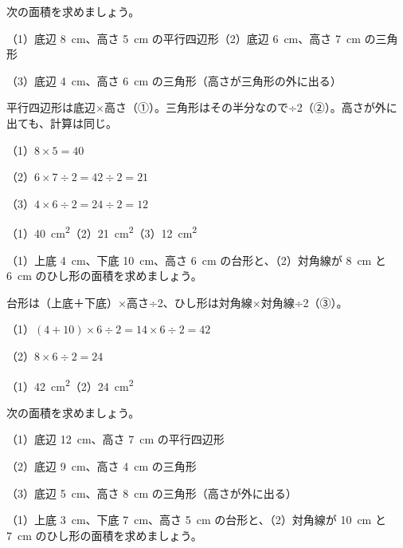 \begin{reidai}[平行四辺形と三角形の面積]
次の面積を求めましょう。\par
（1）底辺 \qty{8}{cm}、高さ \qty{5}{cm} の平行四辺形\quad（2）底辺 \qty{6}{cm}、高さ \qty{7}{cm} の三角形\par
（3）底辺 \qty{4}{cm}、高さ \qty{6}{cm} の三角形（高さが三角形の外に出る）\par
\kangaekata 平行四辺形は底辺×高さ（①）。三角形はその半分なので÷2（②）。高さが外に出ても、計算は同じ。\par
\shiki（1）$8\times5=40$\par
\hspace*{2.6\zw}（2）$6\times7\div2=42\div2=21$\par
\hspace*{2.6\zw}（3）$4\times6\div2=24\div2=12$\par
\kotae（1）\qty{40}{cm^2}\quad（2）\qty{21}{cm^2}\quad（3）\qty{12}{cm^2}
\end{reidai}

\begin{reidai}[台形とひし形の面積]
（1）上底 \qty{4}{cm}、下底 \qty{10}{cm}、高さ \qty{6}{cm} の台形と、（2）対角線が \qty{8}{cm} と \qty{6}{cm} のひし形の面積を求めましょう。\par
\kangaekata 台形は（上底＋下底）×高さ÷2、ひし形は対角線×対角線÷2（③）。\par
\shiki（1）$(4+10)\times6\div2=14\times6\div2=42$\par
\hspace*{2.6\zw}（2）$8\times6\div2=24$\par
\kotae（1）\qty{42}{cm^2}\quad（2）\qty{24}{cm^2}
\end{reidai}

\noindent\begin{minipage}[t]{0.485\linewidth}\vspace{0pt}\raggedright
\begin{jibun}\raggedright
次の面積を求めましょう。\par（1）底辺 \qty{12}{cm}、高さ \qty{7}{cm} の平行四辺形\par（2）底辺 \qty{9}{cm}、高さ \qty{4}{cm} の三角形\par（3）底辺 \qty{5}{cm}、高さ \qty{8}{cm} の三角形（高さが外に出る）
\end{jibun}
\end{minipage}\hfill
\begin{minipage}[t]{0.485\linewidth}\vspace{0pt}\raggedright
\begin{jibun}\raggedright
（1）上底 \qty{3}{cm}、下底 \qty{7}{cm}、高さ \qty{5}{cm} の台形と、（2）対角線が \qty{10}{cm} と \qty{7}{cm} のひし形の面積を求めましょう。
\end{jibun}
\end{minipage}

